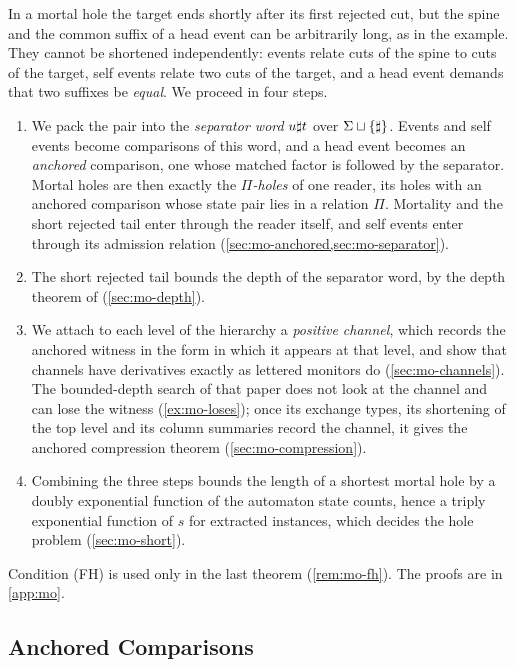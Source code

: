 In a mortal hole the target ends shortly after its first rejected cut, but the
spine and the common suffix of a head event can be arbitrarily long, as in the
example. They cannot be shortened independently: events relate cuts of the
spine to cuts of the target, self events relate two cuts of the target, and a
head event demands that two suffixes be \emph{equal}. We proceed in four steps.
\begin{enumerate}[leftmargin=*]
\item We pack the pair into the \emph{separator word} $u\sharp t$ over
  $\Sigma\sqcup\{\sharp\}$. Events and self events become comparisons of this
  word, and a head event becomes an \emph{anchored} comparison, one whose
  matched factor is followed by the separator. Mortal holes are then exactly
  the \emph{$\Pi$-holes} of one reader, its holes with an anchored comparison
  whose state pair lies in a relation $\Pi$. Mortality and the short rejected
  tail enter through the reader itself, and self events enter through its
  admission relation (\cref{sec:mo-anchored,sec:mo-separator}).
\item The short rejected tail bounds the depth of the separator word, by the
  depth theorem of \citet{Zhao26} (\cref{sec:mo-depth}).
\item We attach to each level of the hierarchy a \emph{positive channel},
  which records the anchored witness in the form in which it appears at that
  level, and show that channels have derivatives exactly as lettered monitors
  do (\cref{sec:mo-channels}). The bounded-depth search of that paper does not
  look at the channel and can lose the witness (\cref{ex:mo-loses}); once its
  exchange types, its shortening of the top level and its column summaries
  record the channel, it gives the anchored compression theorem
  (\cref{sec:mo-compression}).
\item Combining the three steps bounds the length of a shortest mortal hole by
  a doubly exponential function of the automaton state counts, hence a triply
  exponential function of $s$ for extracted instances, which decides the hole
  problem (\cref{sec:mo-short}).
\end{enumerate}
Condition (FH) is used only in the last theorem (\cref{rem:mo-fh}). The proofs
are in \cref{app:mo}.

\subsection{Anchored Comparisons}\label{sec:mo-anchored}

